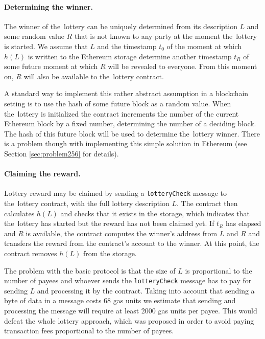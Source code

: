 \documentclass[a4paper]{article}
\begin{document}
    \paragraph{Determining the winner.}
    The winner of the~lottery can be uniquely determined from its description $L$ and some random value $R$ that
    is not known to any party at the moment the~lottery is started. We assume that $L$ and the timestamp $t_0$ of
    the moment at which $h(L)$ is written to the Ethereum storage determine another timestamp $t_R$ of some future
    moment at which $R$ will be revealed to everyone. From this moment on, $R$ will also be available to the~lottery
    contract.

    A standard way to implement this rather abstract assumption in a blockchain setting is to use the hash of some
    future block as a random value. When the~lottery is initialized the contract increments the number of the current
    Ethereum block by a fixed number, determining the number of a deciding block. The hash of this future block will
    be used to determine the~lottery winner. There is a problem though with implementing this simple solution in
    Ethereum (see Section \ref{sec:problem256} for details).

    \paragraph{Claiming the reward.}
    Lottery reward may be claimed by sending a \texttt{lotteryCheck} message to the~lottery contract, with the
    full lottery description $L$. The contract then calculates $h(L)$ and checks that it exists in the storage,
    which indicates that the~lottery has started but the reward has not been claimed yet.
    If $t_R$ has elapsed and $R$ is available, the contract computes the winner's address from $L$ and $R$ and
    transfers the reward from the contract's account to the winner. At this point, the contract removes $h(L)$
    from the storage.

    The problem with the basic protocol is that the size of $L$ is proportional to the number of payees and whoever
    sends the \texttt{lotteryCheck} message has to pay for sending $L$ and processing it by the contract.
    Taking into account that sending a byte of data in a message costs 68 gas units we estimate that sending and
    processing the message will require at least 2000 gas units per payee. This would defeat the whole lottery
    approach, which was proposed in order to avoid paying transaction fees proportional to the number of payees.
\end{document}
